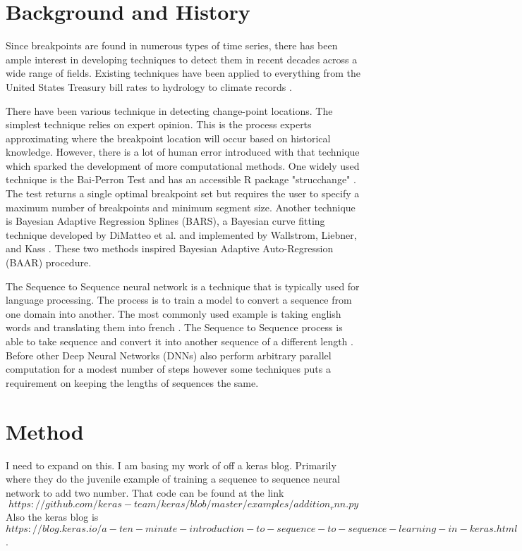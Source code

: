 \documentclass[12pt]{article}
\begin{document}

\section{Background and History}
Since breakpoints are found in numerous types of time series, there has been ample interest in developing techniques to detect them in recent decades across a wide range of fields. Existing techniques have been applied to everything from the United States Treasury bill rates \cite{Pesaran} to hydrology \cite{Seidou} to climate records \cite{Ruggieri}.

There have been various technique in detecting change-point locations. The simplest technique relies on expert opinion. This is the process experts approximating where the breakpoint location will occur based on historical knowledge.  However, there is a lot of human error introduced with that technique which sparked the development of more computational methods. One widely used technique is the  Bai-Perron Test \cite{Bai} and has an accessible R package "strucchange" \cite{Zeileis}. The test returns a single optimal breakpoint set but requires the user to specify a maximum number of breakpoints and minimum segment size. Another technique is Bayesian Adaptive Regression Splines (BARS), a Bayesian curve fitting technique developed by DiMatteo et al. \cite{DiMatteo} and implemented by Wallstrom, Liebner, and Kass \cite{Wallstrom}.  These two methods inspired Bayesian Adaptive Auto-Regression (BAAR) procedure. 

The Sequence to Sequence neural network is a technique that is typically used for language processing.  The process is to train a model to convert a sequence from one domain into another. The most commonly used example is taking english words and translating them into french \cite{Sutskever}.  The Sequence to Sequence process is able to take sequence and convert it into another sequence of a different length  \cite{Sutskever}.  Before other Deep Neural Networks (DNNs) also perform arbitrary parallel computation for a modest number of steps however some techniques puts a requirement on keeping the lengths of sequences the same. 




\section{Method}
I need to expand on this. I am basing my work of off a keras blog. Primarily where they do the juvenile example of training a sequence to sequence neural network to add two number. That code can be found at the link $$https://github.com/keras-team/keras/blob/master/examples/addition_rnn.py$$ Also the keras blog is 
$https://blog.keras.io/a-ten-minute-introduction-to-sequence-to-sequence-learning-in-keras.html$.
\end{document}
